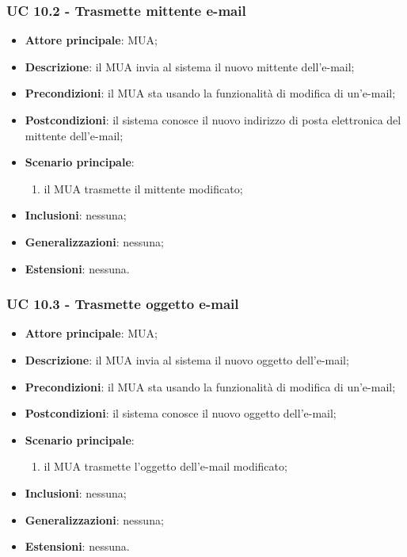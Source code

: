     \subsubsection{UC 10.2 - Trasmette mittente e-mail} \label{sec:UC10.2}
    \begin{itemize}
        \item \textbf{Attore principale}: MUA;
        \item \textbf{Descrizione}: il MUA invia al sistema il nuovo mittente dell'e-mail;
        \item \textbf{Precondizioni}: il MUA sta usando la funzionalità di modifica di un'e-mail;
        \item \textbf{Postcondizioni}: il sistema conosce il nuovo indirizzo di posta elettronica del mittente dell'e-mail;
        \item \textbf{Scenario principale}:
            \begin{enumerate}
                \item il MUA trasmette il mittente modificato;
            \end{enumerate}
        \item \textbf{Inclusioni}: nessuna;
        \item \textbf{Generalizzazioni}: nessuna;
        \item \textbf{Estensioni}: nessuna.
    \end{itemize}

    \subsubsection{UC 10.3 - Trasmette oggetto e-mail} \label{sec:UC10.3}
    \begin{itemize}
        \item \textbf{Attore principale}: MUA;
        \item \textbf{Descrizione}: il MUA invia al sistema il nuovo oggetto dell'e-mail;
        \item \textbf{Precondizioni}: il MUA sta usando la funzionalità di modifica di un'e-mail;
        \item \textbf{Postcondizioni}: il sistema conosce il nuovo oggetto dell'e-mail;
        \item \textbf{Scenario principale}:
            \begin{enumerate}
                \item il MUA trasmette l'oggetto dell'e-mail modificato;
            \end{enumerate}
        \item \textbf{Inclusioni}: nessuna;
        \item \textbf{Generalizzazioni}: nessuna;
        \item \textbf{Estensioni}: nessuna.
    \end{itemize}


